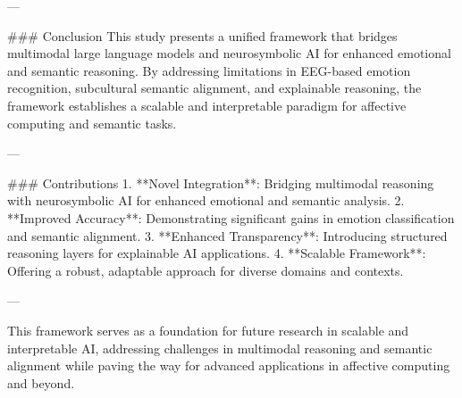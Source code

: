 ---

### Conclusion  
This study presents a unified framework that bridges multimodal large language models and neurosymbolic AI for enhanced emotional and semantic reasoning. By addressing limitations in EEG-based emotion recognition, subcultural semantic alignment, and explainable reasoning, the framework establishes a scalable and interpretable paradigm for affective computing and semantic tasks.

---

### Contributions  
1. **Novel Integration**: Bridging multimodal reasoning with neurosymbolic AI for enhanced emotional and semantic analysis.  
2. **Improved Accuracy**: Demonstrating significant gains in emotion classification and semantic alignment.  
3. **Enhanced Transparency**: Introducing structured reasoning layers for explainable AI applications.  
4. **Scalable Framework**: Offering a robust, adaptable approach for diverse domains and contexts.

---

This framework serves as a foundation for future research in scalable and interpretable AI, addressing challenges in multimodal reasoning and semantic alignment while paving the way for advanced applications in affective computing and beyond.